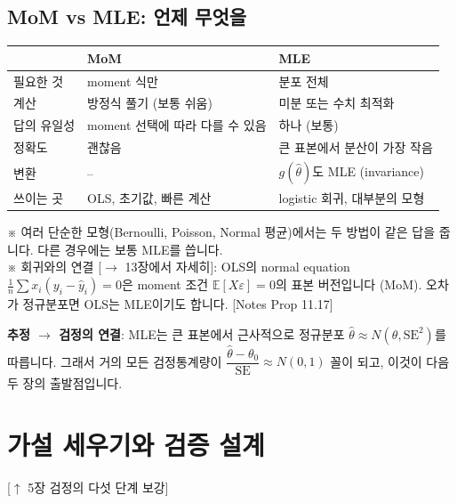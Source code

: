 \documentclass[11pt,a4paper]{article}
\newcommand{\E}{\mathbb{E}}
\newcommand{\SE}{\mathrm{SE}}
\newcommand{\nref}[1]{{\footnotesize\textsf{\color{blue!55!black}[Notes #1]}}}
\newcommand{\aside}[1]{{\footnotesize\color{black!65}#1}}
\newcommand{\linkup}[1]{{\footnotesize\textsf{\color{green!40!black}[$\uparrow$ #1 보강]}}}
\newcommand{\fwd}[1]{{\footnotesize\textsf{\color{green!40!black}[$\to$ #1에서 자세히]}}}
\begin{document}
\subsection{MoM vs MLE: 언제 무엇을}
\begin{center}
\begin{tabular}{@{}p{3cm} p{5.5cm} p{5.5cm}@{}}
\toprule
 & MoM & MLE \\
\midrule
필요한 것 & moment 식만 & 분포 전체 \\
계산 & 방정식 풀기 (보통 쉬움) & 미분 또는 수치 최적화 \\
답의 유일성 & moment 선택에 따라 다를 수 있음 & 하나 (보통) \\
정확도 & 괜찮음 & 큰 표본에서 분산이 가장 작음 \\
변환 & -- & $g(\hat\theta)$도 MLE (invariance) \\
쓰이는 곳 & OLS, 초기값, 빠른 계산 & logistic 회귀, 대부분의 모형 \\
\bottomrule
\end{tabular}
\end{center}
\aside{※ 여러 단순한 모형(Bernoulli, Poisson, Normal 평균)에서는 두 방법이 같은 답을 줍니다. 다른 경우에는 보통 MLE를 씁니다.}\\
\aside{※ 회귀와의 연결 \fwd{13장}: OLS의 normal equation $\frac1n\sum x_i(y_i-\hat y_i)=0$은 moment 조건 $\E[X\varepsilon]=0$의 표본 버전입니다 (MoM). 오차가 정규분포면 OLS는 MLE이기도 합니다. \nref{Prop 11.17}}

\begin{hypbox}
\textbf{추정 $\to$ 검정의 연결}: MLE는 큰 표본에서 근사적으로 정규분포 $\hat\theta\approx N(\theta,\SE^2)$를 따릅니다. 그래서 거의 모든 검정통계량이 $\dfrac{\hat\theta-\theta_0}{\SE}\approx N(0,1)$ 꼴이 되고, 이것이 다음 두 장의 출발점입니다.
\end{hypbox}

\section{가설 세우기와 검증 설계}
\linkup{5장 검정의 다섯 단계}
\end{document}
